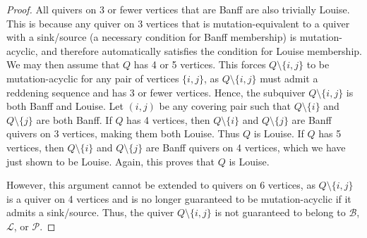 \documentclass[10pt]{amsart}
\theoremstyle{definition}
\theoremstyle{remark}
\newcommand{\BB}{\mathcal{B}}
\newcommand{\PP}{\mathcal{P}}
\newcommand{\LL}{\mathcal{L}}
\begin{document}
\begin{proof}
    All quivers on 3 or fewer vertices that are Banff are also trivially Louise.
    This is because any quiver on 3 vertices that is mutation-equivalent to a quiver with a sink/source (a necessary condition for Banff membership) is mutation-acyclic, and therefore automatically satisfies the condition for Louise membership.
    We may then assume that $Q$ has 4 or 5 vertices.
    This forces $Q \setminus\{i,j\}$ to be mutation-acyclic for any pair of vertices $\{i,j\}$, as $Q \setminus\{i,j\}$ must admit a reddening sequence and has 3 or fewer vertices.
    Hence, the subquiver $Q \setminus \{i,j\}$ is both Banff and Louise. 
    Let $(i,j)$ be any covering pair such that $Q \setminus \{i\}$ and $Q \setminus \{j\}$ are both Banff.
    If $Q$ has 4 vertices, then $Q \setminus \{i\}$ and $Q \setminus \{j\}$ are Banff quivers on 3 vertices, making them both Louise. 
    Thus $Q$ is Louise.
    If $Q$ has 5 vertices, then $Q \setminus \{i\}$ and $Q \setminus \{j\}$ are Banff quivers on 4 vertices, which we have just shown to be Louise.
    Again, this proves that $Q$ is Louise.
    
    However, this argument cannot be extended to quivers on 6 vertices, as $Q \setminus \{i,j\}$ is a quiver on 4 vertices and is no longer guaranteed to be mutation-acyclic if it admits a sink/source.
    Thus, the quiver $Q \setminus \{i,j\}$ is not guaranteed to belong to $\BB$, $\LL$, or $\PP$.
\end{proof}
\end{document}
